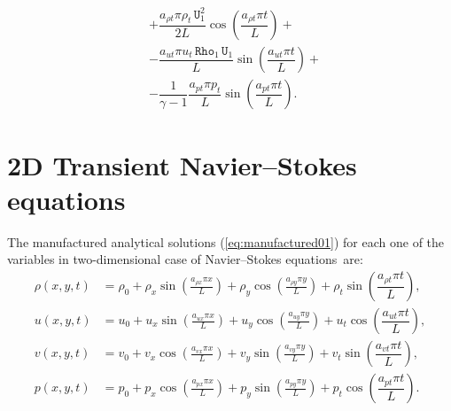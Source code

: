 \documentclass[10pt]{article}
\newcommand{\Rho}{\,\mathtt{Rho}}
\newcommand{\U}{\,\mathtt{U}}
\begin{document}
\begin{equation}
 \begin{split}\label{eq:source_e}
&+\dfrac{a_{\rho t} \pi \rho_t \U_1^2}{2L}\cos\left(\dfrac{a_{\rho t} \pi t}{L}\right)+\\
&-\dfrac{a_{ut} \pi u_t  \Rho_1 \U_1 }{L}\sin\left(\dfrac{a_{ut} \pi t}{L}\right)+\\
&-\dfrac{1}{\gamma-1}\dfrac{a_{pt} \pi p_t }{L}\sin\left(\dfrac{a_{pt} \pi t}{L}\right).
 \end{split}
\end{equation}

 \section{2D Transient Navier--Stokes equations}
The manufactured analytical solutions (\ref{eq:manufactured01}) for each one of the variables in two-dimensional case of Navier--Stokes equations~are:
\begin{equation}
\begin{split}
\label{eq:manufactured_2d}
\rho\left(x,y,t\right) &=  \rho_{0}+ \rho_{x} \sin\left(\frac{a_{ \rho x} \pi x}{L}\right)+ \rho_{y} \cos\left(\frac{a_{ \rho y} \pi y}{L}\right)+ \rho_t \sin\left(\dfrac{a_{\rho t} \pi t}{L}\right),\\
u\left(x,y,t\right) &= u_{0}+u_{x} \sin\left(\frac{a_{u x} \pi x}{L}\right)+u_{y} \cos\left(\frac{a_{u y} \pi y}{L}\right) + u_t \cos\left(\dfrac{a_{u t} \pi t}{L}\right),\\
v\left(x,y,t\right) &= v_{0}+v_{x} \cos\left(\frac{a_{v x} \pi x}{L}\right)+v_{y} \sin\left(\frac{a_{v y} \pi y}{L}\right)+ v_t \sin\left(\dfrac{a_{v t} \pi t}{L}\right),\\
p\left(x,y,t\right) &= p_{0}+p_{x} \cos\left(\frac{a_{p x} \pi x}{L}\right)+p_{y} \sin\left(\frac{a_{p y} \pi y}{L}\right)+ p_t \cos\left(\dfrac{a_{p t} \pi t}{L}\right).\\
\end{split}
\end{equation}
\end{document}
